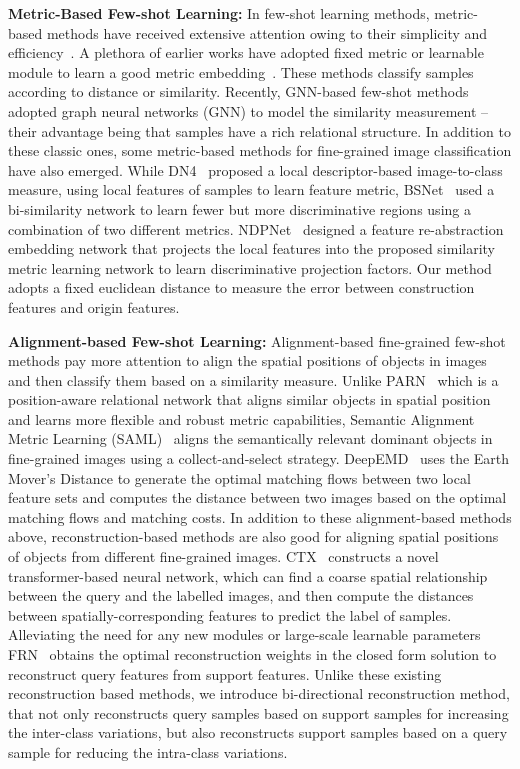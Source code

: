 \documentclass[letterpaper]{article} %
\begin{document}
\textbf{Metric-Based Few-shot Learning:}
In few-shot learning methods, metric-based methods have received extensive attention owing to their simplicity and efficiency~\cite{Li2021DeepML}. 
{A plethora of earlier works have adopted fixed metric or learnable module to learn a good metric embedding~\cite{NIPS2017_cb8da676, DBLP:conf/nips/VinyalsBLKW16, 8578229}. These methods classify samples according to distance or similarity.} 
Recently, GNN-based few-shot methods~\cite{garcia2018fewshot, Kim_2019_CVPR, Yang_2020_CVPR} adopted graph neural networks (GNN) to model the similarity measurement -- their advantage being that samples have a rich relational structure.
In addition to these classic ones, some metric-based methods for fine-grained image classification have also emerged. 
While DN4~\cite{8953758} proposed a local descriptor-based image-to-class measure, using local features of samples to learn feature metric, {BSNet~\cite{9293172} used a bi-similarity network to learn fewer but more discriminative regions using a combination of two different metrics.} 
NDPNet~\cite{Zhang2021NDPNetAN} designed a feature re-abstraction embedding network that projects the local features into the proposed similarity metric learning network to learn discriminative projection factors. 
Our method adopts a fixed euclidean distance to measure the error between construction features and origin features.




\textbf{Alignment-based Few-shot Learning:}
Alignment-based fine-grained few-shot methods pay more attention to align the spatial positions of objects in images and then classify them based on a similarity measure.
Unlike PARN~\cite{Wu_2019_ICCV} which is a position-aware relational network that aligns similar objects in spatial position and learns more flexible and robust metric capabilities,  
Semantic Alignment Metric Learning (SAML)~\cite{Hao2019CollectAS} aligns the semantically relevant dominant objects in fine-grained images using a collect-and-select strategy.
DeepEMD~\cite{Zhang_2020_CVPR} uses the Earth Mover's Distance to generate the optimal matching flows between two local feature sets and computes the distance between two images based on the optimal matching flows and matching costs. 
In addition to these alignment-based methods above, reconstruction-based methods are also good for aligning spatial positions of objects from different fine-grained images. 
CTX~\cite{NEURIPS2020_fa28c6cd} constructs a novel transformer-based neural network, which can find a coarse spatial relationship between the query and the labelled images, and then compute the distances between spatially-corresponding features to predict the label of samples. 
Alleviating the need for any new modules or large-scale learnable parameters FRN~\cite{Wertheimer_2021_CVPR} obtains the optimal reconstruction weights in the closed form solution to reconstruct query features from support features.
Unlike these existing reconstruction based methods, we introduce bi-directional reconstruction method, that not only reconstructs query samples based on support samples for increasing the inter-class variations, but also reconstructs support samples based on a query sample for reducing the intra-class variations.
\end{document}
